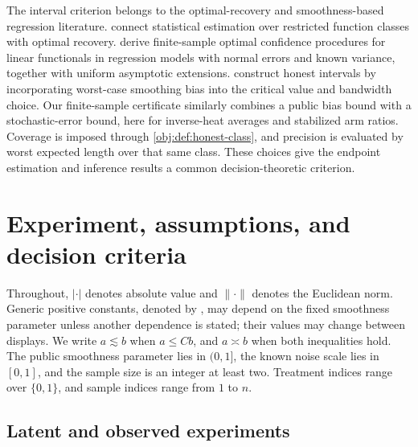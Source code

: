 \documentclass[11pt]{article}
\begin{document}
The interval criterion belongs to the optimal-recovery and smoothness-based regression literature. \citet{Donoho1994} connect statistical estimation over restricted function classes with optimal recovery. \citet{ArmstrongKolesar2018OptimalInference} derive finite-sample optimal confidence procedures for linear functionals in regression models with normal errors and known variance, together with uniform asymptotic extensions. \citet{ArmstrongKolesar2020SimpleHonest} construct honest intervals by incorporating worst-case smoothing bias into the critical value and bandwidth choice. Our finite-sample certificate similarly combines a public bias bound with a stochastic-error bound, here for inverse-heat averages and stabilized arm ratios. Coverage is imposed through \cref{obj:def:honest-class}, and precision is evaluated by worst expected length over that same class. These choices give the endpoint estimation and inference results a common decision-theoretic criterion.


\section{Experiment, assumptions, and decision criteria}

Throughout, \(\lvert\cdot\rvert\) denotes absolute value and \(\|\cdot\|\) denotes the Euclidean norm. Generic positive constants, denoted by , may depend on the fixed smoothness parameter unless another dependence is stated; their values may change between displays. We write \(a\lesssim b\) when \(a\le Cb\), and \(a\asymp b\) when both inequalities hold. The public smoothness parameter  lies in \((0,1]\), the known noise scale  lies in \([0,1]\), and the sample size  is an integer at least two. Treatment indices  range over \(\{0,1\}\), and sample indices  range from \(1\) to \(n\).

\subsection{Latent and observed experiments}
\end{document}
